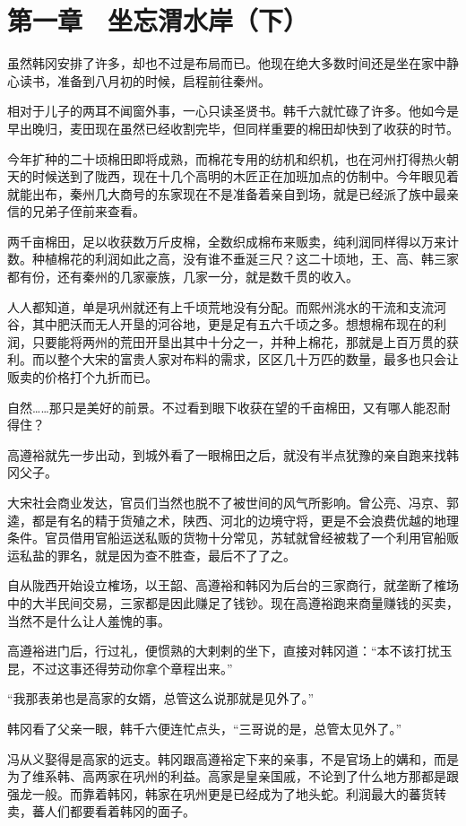 \section{第一章　坐忘渭水岸（下）}

虽然韩冈安排了许多，却也不过是布局而已。他现在绝大多数时间还是坐在家中静心读书，准备到八月初的时候，启程前往秦州。

相对于儿子的两耳不闻窗外事，一心只读圣贤书。韩千六就忙碌了许多。他如今是早出晚归，麦田现在虽然已经收割完毕，但同样重要的棉田却快到了收获的时节。

今年扩种的二十顷棉田即将成熟，而棉花专用的纺机和织机，也在河州打得热火朝天的时候送到了陇西，现在十几个高明的木匠正在加班加点的仿制中。今年眼见着就能出布，秦州几大商号的东家现在不是准备着亲自到场，就是已经派了族中最亲信的兄弟子侄前来查看。

两千亩棉田，足以收获数万斤皮棉，全数织成棉布来贩卖，纯利润同样得以万来计数。种植棉花的利润如此之高，没有谁不垂涎三尺？这二十顷地，王、高、韩三家都有份，还有秦州的几家豪族，几家一分，就是数千贯的收入。

人人都知道，单是巩州就还有上千顷荒地没有分配。而熙州洮水的干流和支流河谷，其中肥沃而无人开垦的河谷地，更是足有五六千顷之多。想想棉布现在的利润，只要能将两州的荒田开垦出其中十分之一，并种上棉花，那就是上百万贯的获利。而以整个大宋的富贵人家对布料的需求，区区几十万匹的数量，最多也只会让贩卖的价格打个九折而已。

自然……那只是美好的前景。不过看到眼下收获在望的千亩棉田，又有哪人能忍耐得住？

高遵裕就先一步出动，到城外看了一眼棉田之后，就没有半点犹豫的亲自跑来找韩冈父子。

大宋社会商业发达，官员们当然也脱不了被世间的风气所影响。曾公亮、冯京、郭逵，都是有名的精于货殖之术，陕西、河北的边境守将，更是不会浪费优越的地理条件。官员借用官船运送私贩的货物十分常见，苏轼就曾经被栽了一个利用官船贩运私盐的罪名，就是因为查不胜查，最后不了了之。

自从陇西开始设立榷场，以王韶、高遵裕和韩冈为后台的三家商行，就垄断了榷场中的大半民间交易，三家都是因此赚足了钱钞。现在高遵裕跑来商量赚钱的买卖，当然不是什么让人羞愧的事。

高遵裕进门后，行过礼，便惯熟的大剌剌的坐下，直接对韩冈道：“本不该打扰玉昆，不过这事还得劳动你拿个章程出来。”

“我那表弟也是高家的女婿，总管这么说那就是见外了。”

韩冈看了父亲一眼，韩千六便连忙点头，“三哥说的是，总管太见外了。”

冯从义娶得是高家的远支。韩冈跟高遵裕定下来的亲事，不是官场上的媾和，而是为了维系韩、高两家在巩州的利益。高家是皇亲国戚，不论到了什么地方那都是跟强龙一般。而靠着韩冈，韩家在巩州更是已经成为了地头蛇。利润最大的蕃货转卖，蕃人们都要看着韩冈的面子。

